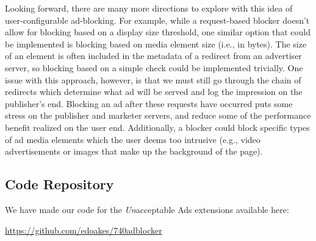 Looking forward, there are many more directions to explore with this idea of user-configurable ad-blocking.
For example, while a request-based blocker doesn't allow for blocking based on a display size threshold, one similar option that could be implemented is blocking based on media element size (i.e., in bytes).
The size of an element is often included in the metadata of a redirect from an advertiser server, so blocking based on a simple check could be implemented trivially.
One issue with this approach, however, is that we must still go through the chain of redirects which determine what ad will be served and log the impression on the publisher's end.
Blocking an ad after these requests have occurred puts some stress on the publisher and marketer servers, and reduce some of the performance benefit realized on the user end.
Additionally, a blocker could block specific types of ad media elements which the user deems too intrusive (e.g., video advertisements or images that make up the background of the page).

\subsection{Code Repository}
We have made our code for the \textit{Un}acceptable Ads extensions available here:

\url{https://github.com/edoakes/740adblocker}